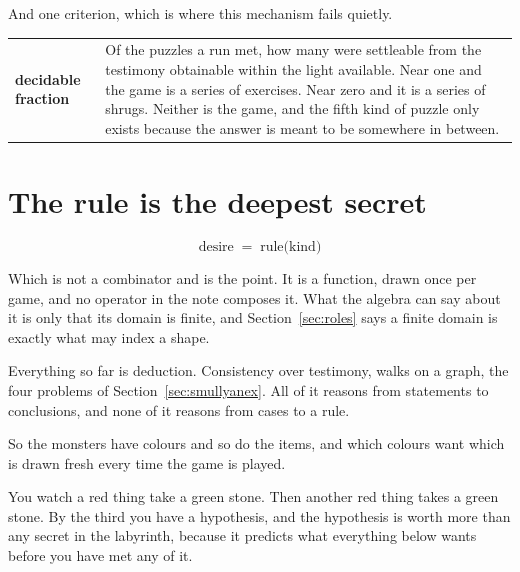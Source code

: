 \documentclass[11pt,a4paper]{article}
\begin{document}
And one criterion, which is where this mechanism fails quietly.

\begin{center}
\begin{tabular}{@{}l@{\hspace{5mm}}>{\raggedright\arraybackslash}p{}@{}}
\toprule
\textbf{decidable fraction} & Of the puzzles a run met, how many were settleable from the testimony
obtainable within the light available. Near one and the game is a series of exercises. Near zero and
it is a series of shrugs. Neither is the game, and the fifth kind of puzzle only exists because the
answer is meant to be somewhere in between.
\end{tabular}
\end{center}

\newpage

\section{The rule is the deepest secret}
\label{sec:colour}

\begin{center}
\begin{tcolorbox}[plainbg, colback=pale, width=0.86\textwidth]
\[ \text{desire} \;=\; \text{rule}\bigl(\text{kind}\bigr) \]
\end{tcolorbox}
\end{center}

Which is not a combinator and is the point. It is a function, drawn once per game, and no operator
in the note composes it. What the algebra can say about it is only that its domain is finite, and
Section~\ref{sec:roles} says a finite domain is exactly what may index a shape.


Everything so far is deduction. Consistency over testimony, walks on a graph, the four problems of
Section~\ref{sec:smullyanex}. All of it reasons from statements to conclusions, and none of it
reasons from cases to a rule.

So the monsters have colours and so do the items, and which colours want which is drawn fresh every
time the game is played.

\begin{sectionbox}
You watch a red thing take a green stone. Then another red thing takes a green stone. By the third
you have a hypothesis, and the hypothesis is worth more than any secret in the labyrinth, because
it predicts what everything below wants before you have met any of it.
\end{sectionbox}
\end{document}
